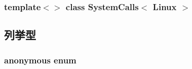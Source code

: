 \subsubsection*{template$<$$>$ class SystemCalls$<$ Linux $>$}



\subsection{列挙型}
\hypertarget{classSystemCalls_3_01Linux_01_4_aeb8e1c282570d629a6b603a94a4650d6}{
\subsubsection[{"@68}]{\setlength{\rightskip}{0pt plus 5cm}anonymous enum}}
\label{classSystemCalls_3_01Linux_01_4_aeb8e1c282570d629a6b603a94a4650d6}
